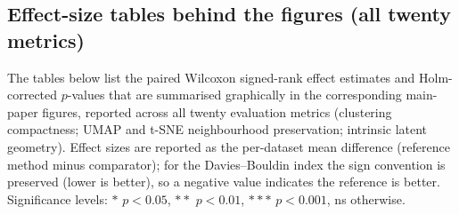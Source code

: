 \documentclass[referee, pdflatex, sn-vancouver-num]{sn-jnl}
\begin{document}
\begin{appendices}
\subsection*{Effect-size tables behind the figures (all twenty metrics)}\label{app:effects}

The tables below list the paired Wilcoxon signed-rank effect estimates and Holm-corrected $p$-values that are summarised graphically in the corresponding main-paper figures, reported across all twenty evaluation metrics (clustering compactness; UMAP and t-SNE neighbourhood preservation; intrinsic latent geometry). Effect sizes are reported as the per-dataset mean difference (reference method minus comparator); for the Davies--Bouldin index the sign convention is preserved (lower is better), so a negative value indicates the reference is better. Significance levels: $*$ $p<0.05$, $**$ $p<0.01$, $***$ $p<0.001$, ns otherwise.




\end{appendices}

\end{document}
